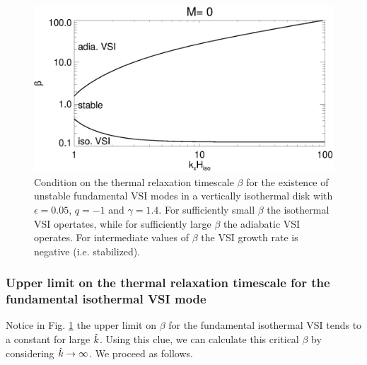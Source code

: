 \begin{figure}
  \includegraphics[width=\linewidth]{figures/bcrit_theory}
  \caption{Condition on the thermal relaxation timescale $\beta$ for the existence of unstable fundamental VSI
    modes in a vertically isothermal disk with $\epsilon=0.05$, $q=-1$
    and $\gamma=1.4$. For sufficiently small $\beta$ the isothermal VSI opertates,
    while for sufficiently large $\beta$ the adiabatic VSI
    operates. For intermediate values of $\beta$ the VSI growth rate
    is negative (i.e. stabilized). 
    \label{relax_bcrit}}  
\end{figure}   


\subsubsection{Upper limit on the thermal relaxation timescale for the
  fundamental isothermal VSI mode}\label{iso_vsi_beta_crit}
Notice in Fig. \ref{relax_bcrit} the upper limit on $\beta$ for the
fundamental isothermal VSI tends to a constant for large
$\hat{k}$. Using this clue, we can calculate this critical $\beta$ by
considering $\hat{k}\to\infty$. We proceed as follows. 

